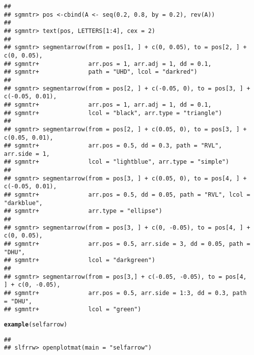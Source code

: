 \documentclass{article}\usepackage[]{graphicx}\usepackage[]{color}
\makeatletter
\newcommand{\hlfunctioncall}[1]{\textcolor[rgb]{0.501960784313725,0,0.329411764705882}{\textbf{#1}}}%
\newenvironment{kframe}{%
 \def\at@end@of@kframe{}%
 \ifinner\ifhmode%
  \def\at@end@of@kframe{\end{minipage}}%
  \begin{minipage}{\columnwidth}%
 \fi\fi%
 \def\FrameCommand##1{\hskip\@totalleftmargin \hskip-\fboxsep
 \colorbox{shadecolor}{##1}\hskip-\fboxsep
     \hskip-\linewidth \hskip-\@totalleftmargin \hskip\columnwidth}%
 \MakeFramed {\advance\hsize-\width
   \@totalleftmargin\z@ \linewidth\hsize
   \@setminipage}}%
 {\par\unskip\endMakeFramed%
 \at@end@of@kframe}
\newenvironment{knitrout}{}{} %
\makeatother
\begin{document}
\begin{knitrout}
\begin{kframe}
\begin{verbatim}
## 
## sgmntr> pos <-cbind(A <- seq(0.2, 0.8, by = 0.2), rev(A))
## 
## sgmntr> text(pos, LETTERS[1:4], cex = 2)
## 
## sgmntr> segmentarrow(from = pos[1, ] + c(0, 0.05), to = pos[2, ] + c(0, 0.05),
## sgmntr+              arr.pos = 1, arr.adj = 1, dd = 0.1, 
## sgmntr+              path = "UHD", lcol = "darkred")
## 
## sgmntr> segmentarrow(from = pos[2, ] + c(-0.05, 0), to = pos[3, ] + c(-0.05, 0.01),
## sgmntr+              arr.pos = 1, arr.adj = 1, dd = 0.1,
## sgmntr+              lcol = "black", arr.type = "triangle")
## 
## sgmntr> segmentarrow(from = pos[2, ] + c(0.05, 0), to = pos[3, ] + c(0.05, 0.01),
## sgmntr+              arr.pos = 0.5, dd = 0.3, path = "RVL", arr.side = 1,
## sgmntr+              lcol = "lightblue", arr.type = "simple")  
## 
## sgmntr> segmentarrow(from = pos[3, ] + c(0.05, 0), to = pos[4, ] + c(-0.05, 0.01),
## sgmntr+              arr.pos = 0.5, dd = 0.05, path = "RVL", lcol = "darkblue",
## sgmntr+              arr.type = "ellipse")  
## 
## sgmntr> segmentarrow(from = pos[3, ] + c(0, -0.05), to = pos[4, ] + c(0, 0.05),
## sgmntr+              arr.pos = 0.5, arr.side = 3, dd = 0.05, path = "DHU",
## sgmntr+              lcol = "darkgreen")  
## 
## sgmntr> segmentarrow(from = pos[3,] + c(-0.05, -0.05), to = pos[4, ] + c(0, -0.05),
## sgmntr+              arr.pos = 0.5, arr.side = 1:3, dd = 0.3, path = "DHU",
## sgmntr+              lcol = "green")
\end{verbatim}
\begin{alltt}
\hlfunctioncall{example}(selfarrow)
\end{alltt}
\begin{verbatim}
## 
## slfrrw> openplotmat(main = "selfarrow")


\end{verbatim}
\end{kframe}
\end{knitrout}
\end{document}
